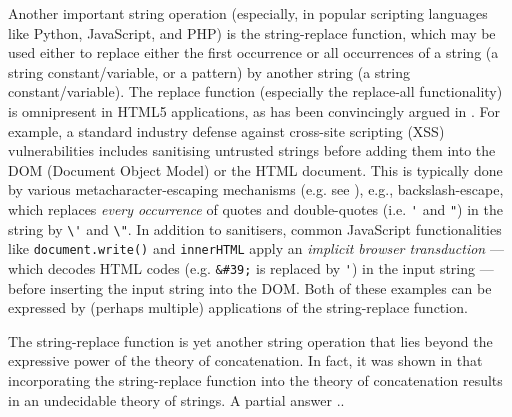 Another important string operation (especially, in popular scripting
languages like Python, JavaScript, and PHP) is the string-replace function, 
which may be used either to replace either the first occurrence or
all occurrences of a string (a string constant/variable, or a pattern) by 
another string (a string constant/variable). The replace function (especially 
the replace-all functionality) is omnipresent in HTML5 applications, as has
been convincingly argued in \cite{LB16,TCJ16,YABI14}. For
example, a standard industry defense against cross-site scripting 
(XSS) vulnerabilities includes sanitising untrusted strings before adding them
into the DOM (Document Object Model) or the HTML document. 
This is typically done by %
various metacharacter-escaping mechanisms (e.g. see 
\cite{Kern14,BEK,OWASP-XSS}), e.g., backslash-escape, which replaces \emph{every
occurrence} of quotes and double-quotes (i.e. \verb+'+ and \verb+"+) in the
string by \verb+\'+ and \verb+\"+. 
In addition
to sanitisers, common JavaScript functionalities like \texttt{document.write()} 
and \texttt{innerHTML} apply an \emph{implicit browser transduction} --- which
decodes HTML codes (e.g. \verb+&#39;+ is replaced by \verb+'+) in the input 
string --- before inserting the input string into the DOM.
Both of these examples can be expressed by (perhaps multiple) 
applications of the string-replace function.

The string-replace function is yet another string operation that lies beyond 
the expressive power of the theory of concatenation. In fact, it was shown in
\cite{LB16} that incorporating the string-replace function into the theory of 
concatenation results in an undecidable theory of strings. A partial answer ..

\OMIT{
Such string functions, however, cannot
be modelled by 


Such a function is frequently used in 



One important application %
for the analysis of string-manipulating programs is an automatic detection
of cross-site scripting (XSS) vulnerabilities
\cite{Berkeley-JavaScript}, which are typically caused by improper handling
of untrusted strings leading to an execution of malicious script in the
clients' browsers. A standard industry defense against XSS is to sanitise these
untrusted strings before adding them into the DOM (Document Object Model) or 
the HTML document. This is typically done by %
certain metacharacter-escaping mechanisms (e.g. see 
\cite{Kern14,BEK,OWASP-XSS}), e.g., backslash-escape, which replaces every 
occurrence of quotes and double-quotes (i.e. \verb+'+ and \verb+"+) in the
string by \verb+\'+ and \verb+\"+. Such string functions, however, cannot
be modelled by 
}

